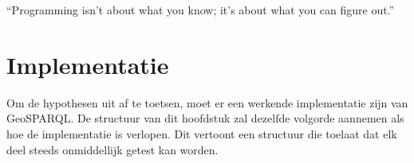 \begin{savequote}[0.55\linewidth]
	``Programming isn't about what you know; it's about what you can figure out.''
\end{savequote}

\chapter{Implementatie}
\label{chap:implementatie}
Om de hypothesen uit  af te toetsen, moet er een werkende implementatie zijn van GeoSPARQL. De structuur van dit hoofdstuk zal dezelfde volgorde aannemen als hoe de implementatie is verlopen. Dit vertoont een structuur die toelaat dat elk deel steeds onmiddellijk getest kan worden. 


 
\newpage
 
\newpage
 
\newpage
 
\newpage
 
\newpage
 
\newpage
 
\newpage